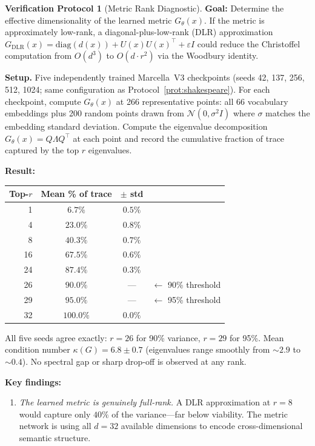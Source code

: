 \documentclass[11pt,a4paper]{article}
\theoremstyle{definition}
\newtheorem{protocol}[theorem]{Verification Protocol}
\theoremstyle{remark}
\begin{document}
\begin{protocol}[Metric Rank Diagnostic]\label{prot:metric_rank}
\textbf{Goal:} Determine the effective dimensionality of the 
learned metric $G_\theta(x)$. If the metric is approximately 
low-rank, a diagonal-plus-low-rank (DLR) approximation 
$G_{\mathrm{DLR}}(x) = \mathrm{diag}(d(x)) + U(x)U(x)^\top + 
\varepsilon I$ could reduce the Christoffel computation from 
$O(d^3)$ to $O(d \cdot r^2)$ via the Woodbury identity.

\textbf{Setup.} Five independently trained Marcella~V3 checkpoints 
(seeds 42, 137, 256, 512, 1024; same configuration as 
Protocol~\ref{prot:shakespeare}). For each checkpoint, compute 
$G_\theta(x)$ at 266 representative points: all 66 vocabulary 
embeddings plus 200 random points drawn from $\mathcal{N}(0, 
\sigma^2 I)$ where $\sigma$ matches the embedding standard 
deviation. Compute the eigenvalue decomposition 
$G_\theta(x) = Q \Lambda Q^\top$ at each point and record the 
cumulative fraction of trace captured by the top $r$ eigenvalues.

\textbf{Result:}
\begin{center}
\begin{tabular}{rccl}
\toprule
Top-$r$ & Mean \% of trace & $\pm$ std & \\
\midrule
 1 & $6.7\%$ & $0.5\%$ & \\
 4 & $23.0\%$ & $0.8\%$ & \\
 8 & $40.3\%$ & $0.7\%$ & \\
16 & $67.5\%$ & $0.6\%$ & \\
24 & $87.4\%$ & $0.3\%$ & \\
26 & $90.0\%$ & --- & $\leftarrow$ 90\% threshold \\
29 & $95.0\%$ & --- & $\leftarrow$ 95\% threshold \\
32 & $100.0\%$ & $0.0\%$ & \\
\bottomrule
\end{tabular}
\end{center}

All five seeds agree exactly: $r = 26$ for 90\% variance, 
$r = 29$ for 95\%.  Mean condition number $\kappa(G) = 6.8 \pm
0.7$ (eigenvalues range smoothly from ${\sim}2.9$ to ${\sim}0.4$).
No spectral gap or sharp drop-off is observed at any rank.

\textbf{Key findings:}
\begin{enumerate}[nosep]
  \item \emph{The learned metric is genuinely full-rank.} 
  A DLR approximation at $r = 8$ would capture only $40\%$ of 
  the variance---far below viability. The metric network is 
  using all $d = 32$ available dimensions to encode cross-dimensional 
  semantic structure.


\end{enumerate}
\end{protocol}
\end{document}
